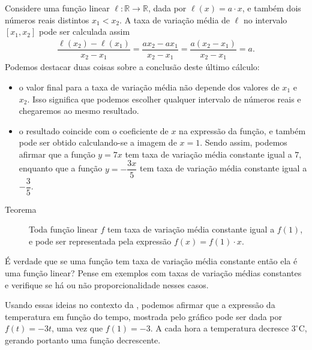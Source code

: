 Considere uma função linear \(\ell:\mathbb{R}\to\mathbb{R}\), dada por \(\ell(x)=a\cdot x\), e também dois números reais distintos \(x_1<x_2\). A taxa de variação média de \(\ell\) no intervalo  \([x_1,x_2]\) pode ser calculada assim
\begin{equation*}
\begin{split}\dfrac{\ell(x_2)-\ell(x_1)}{x_2-x_1}=\dfrac{a x_2- a x_1}{x_2-x_1}=\dfrac{a(x_2-x_1)}{x_2-x_1}=a.\end{split}
\end{equation*}
Podemos destacar duas coisas sobre a conclusão deste último cálculo:
\begin{itemize}
\item {} 
o valor final para a taxa de variação média não depende dos valores de \(x_1\) e \(x_2\). Isso significa que podemos escolher qualquer intervalo  de números reais e chegaremos ao mesmo resultado.

\item {} 
o resultado coincide com o coeficiente de \(x\) na expressão da função, e também pode ser obtido calculando-se a imagem de \(x=1\). Sendo assim, podemos afirmar que a função \(y=7x\) tem taxa de variação média constante igual a \(7\), enquanto que a função \(y=-\dfrac {3x}5\) tem taxa de variação média constante igual a \(-\dfrac {3}5\).

\end{itemize}

\begin{description}
\item[Teorema]
Toda função linear \(f\) tem taxa de variação média constante igual a \(f(1)\), e pode ser representada pela expressão \(f(x)=f(1)\cdot x\).
\end{description}

\begin{reflection}
É verdade que se uma função tem taxa de variação média constante então ela é uma função linear? Pense em exemplos com taxas de variação médias constantes e verifique se há ou não proporcionalidade nesses casos.
\end{reflection}

Usando essas ideias no contexto da , podemos afirmar que a expressão da temperatura em função do tempo, mostrada pelo gráfico pode ser dada por \(f(t)=-3t\), uma vez que \(f(1)=-3\). A cada hora a temperatura decresce \(3^\circ\)C, gerando portanto uma função decrescente.

